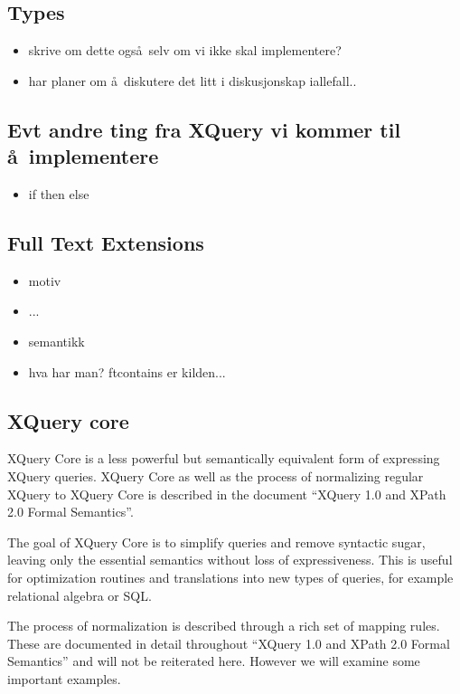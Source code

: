 \subsection{Types}
\begin{itemize}
  \item skrive om dette ogs\aa~selv om vi ikke skal implementere?
  \item har planer om \aa~diskutere det litt i diskusjonskap iallefall..
\end{itemize}

\subsection{Evt andre ting fra XQuery vi kommer til \aa~implementere}

\begin{itemize}
\item if then else

\end{itemize}

\subsection{Full Text Extensions}

\begin{itemize}
\item motiv
\item ...
\item semantikk
\item hva har man? ftcontains er kilden...
\end{itemize}

\subsection{XQuery core}
\label{sect:theory:xqXQcore}
XQuery Core is a less powerful but semantically equivalent form of expressing
XQuery queries. XQuery Core as well as the process of normalizing regular
XQuery to XQuery Core is described in the document ``XQuery 1.0 and XPath 2.0
Formal Semantics''\cite{xquery_semantics}.

The goal of XQuery Core is to simplify queries and remove syntactic sugar,
leaving only the essential semantics without loss of expressiveness.
This is useful for optimization routines and translations into new types of
queries, for example relational algebra or SQL.

The process of normalization is described through a rich set of mapping
rules. These are documented in detail throughout ``XQuery 1.0 and XPath 2.0
Formal Semantics''\cite{xquery_semantics} and will not be reiterated here.
However we will examine some important examples.

